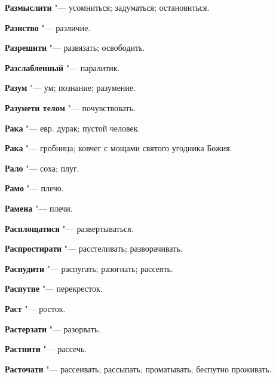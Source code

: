 \begin{mymulticols}{2}
\noindent\textbf{Размыслити} "--- усомниться; задуматься; остановиться. 




\noindent\textbf{Разнство} "--- различие. 




\noindent\textbf{Разрешити} "--- развязать; освободить. 




\noindent\textbf{Разслабленный} "--- паралитик. 




\noindent\textbf{Разум} "--- ум; познание; разумение. 




\noindent\textbf{Разумети телом} "--- почувствовать. 




\noindent\textbf{Рака} "--- евр. дурак; пустой человек. 




\noindent\textbf{Рака} "--- гробница; ковчег с мощами святого угодника Божия. 




\noindent\textbf{Рало} "--- соха; плуг. 




\noindent\textbf{Рамо} "--- плечо. 




\noindent\textbf{Рамена} "--- плечи. 




\noindent\textbf{Расплощатися} "--- развертываться. 




\noindent\textbf{Распростирати} "--- расстеливать; разворачивать. 




\noindent\textbf{Распудити} "--- распугать; разогнать; рассеять. 




\noindent\textbf{Распутие} "--- перекресток. 




\noindent\textbf{Раст} "--- росток. 




\noindent\textbf{Растерзати} "--- разорвать. 




\noindent\textbf{Растнити} "--- рассечь. 




\noindent\textbf{Расточати} "--- рассеивать; рассыпать; проматывать; беспутно проживать. 





\end{mymulticols}
